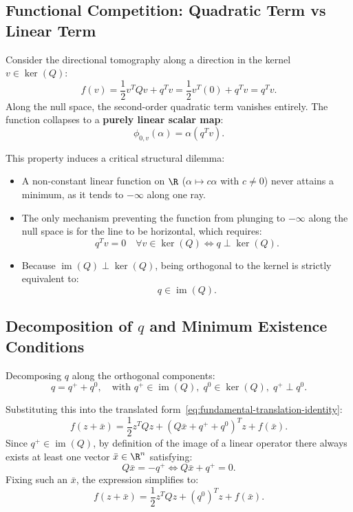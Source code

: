 \subsection{Functional Competition: Quadratic Term vs Linear Term}
Consider the directional tomography along a direction in the kernel $v \in \ker(Q)$:
\begin{equation}
    f(v) = \frac{1}{2} v^T Q v + q^T v = \frac{1}{2} v^T (0) + q^T v = q^T v.
\end{equation}
Along the null space, the second-order quadratic term vanishes entirely. The function collapses to a \textbf{purely linear scalar map}:
\begin{equation}
    \phi_{0, v}(\alpha) = \alpha (q^T v).
\end{equation}

This property induces a critical structural dilemma:
\begin{itemize}
    \item A non-constant linear function on $\R$ ($\alpha \mapsto c\alpha$ with $c \neq 0$) never attains a minimum, as it tends to $-\infty$ along one ray.
    \item The only mechanism preventing the function from plunging to $-\infty$ along the null space is for the line to be horizontal, which requires:
    \begin{equation}
        q^T v = 0 \quad \forall v \in \ker(Q) \iff q \perp \ker(Q).
    \end{equation}
    \item Because $\operatorname{im}(Q) \perp \ker(Q)$, being orthogonal to the kernel is strictly equivalent to:
    \begin{equation}
        q \in \operatorname{im}(Q).
    \end{equation}
\end{itemize}

\subsection{Decomposition of \texorpdfstring{$q$}{q} and Minimum Existence Conditions}
Decomposing $q$ along the orthogonal components:
\begin{equation}
    q = q^+ + q^0, \quad \text{with } q^+ \in \operatorname{im}(Q), \; q^0 \in \ker(Q), \; q^+ \perp q^0.
\end{equation}

Substituting this into the translated form~\eqref{eq:fundamental-translation-identity}:
\begin{equation}
    f(z + \bar{x}) = \frac{1}{2} z^T Q z + (Q \bar{x} + q^+ + q^0)^T z + f(\bar{x}).
\end{equation}
Since $q^+ \in \operatorname{im}(Q)$, by definition of the image of a linear operator there always exists at least one vector $\bar{x} \in \R^n$ satisfying:
\begin{equation}
    Q \bar{x} = -q^+ \iff Q \bar{x} + q^+ = 0.
\end{equation}
Fixing such an $\bar{x}$, the expression simplifies to:
\begin{equation}
    f(z + \bar{x}) = \frac{1}{2} z^T Q z + (q^0)^T z + f(\bar{x}).
    \label{eq:reduced-singular-form-en}
\end{equation}

